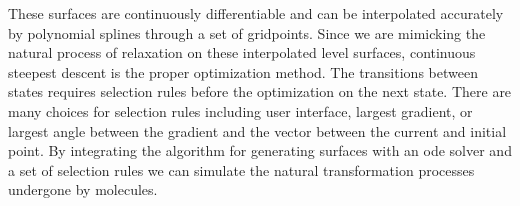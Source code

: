 \documentclass{report}
\begin{document}
These surfaces are continuously differentiable and can be interpolated
accurately by polynomial splines through a set of gridpoints. Since we
are mimicking the natural process of relaxation on these interpolated
level surfaces, continuous steepest descent is the proper optimization
method. The transitions between states requires selection rules before
the optimization on the next state. There are many choices for selection
rules including user interface, largest gradient, or largest angle
between the gradient and the vector between the current and initial
point. By integrating the algorithm for generating surfaces with an ode
solver and a set of selection rules we can simulate the natural
transformation processes undergone by molecules.
\end{document}
